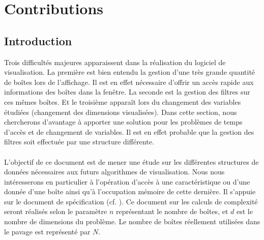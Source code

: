 \chapter{Contributions}\label{chap:con}







\section{Introduction}
Trois difficultés majeures apparaissent dans la réalisation du logiciel de visualisation. La première est bien entendu la gestion d'une très grande quantité de boîtes lors de l'affichage. Il est en effet nécessaire d'offrir un accès rapide aux informations des boîtes dans la fenêtre. La seconde est la gestion des filtres sur ces mêmes boîtes. Et le troisième apparaît lors du changement des variables étudiées (changement des dimensions visualisées). Dans cette section, nous chercherons d'avantage à apporter une solution pour les problèmes de temps d'accès et de changement de variables. Il est en effet probable que la gestion des filtres soit effectuée par une structure différente.
\\ \\

L'objectif de ce document est de mener une étude sur les différentes structures de données nécessaires aux futurs algorithmes de visualisation. Nous nous intéresserons en particulier à l'opération d'accès à une caractéristique ou d'une donnée d'une boîte ainsi qu'à l'occupation mémoire de cette dernière. Il s'appuie sur le document de spécification (cf. \label{sec:spe}). Ce document sur les calculs de complexité seront réalisés selon le paramètre $n$  représentant le nombre de boîtes, et $d$ est le nombre de dimensions du problème. Le nombre de boîtes réellement utilisées dans le pavage est représenté par $N$. 


